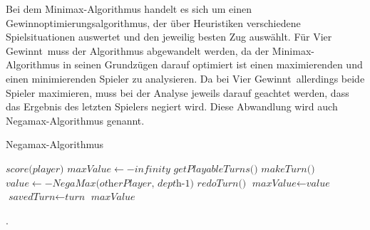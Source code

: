 Bei dem Minimax-Algorithmus handelt es sich um einen Gewinnoptimierungsalgorithmus, der über Heuristiken verschiedene Spielsituationen auswertet und den jeweilig besten Zug auswählt.
Für \glqq Vier Gewinnt\grqq ~muss der Algorithmus abgewandelt werden, da der Minimax-Algorithmus in seinen Grundzügen darauf optimiert ist einen maximierenden und einen minimierenden Spieler zu analysieren. Da bei \glqq Vier Gewinnt\grqq ~allerdings beide Spieler maximieren, muss bei der Analyse jeweils darauf geachtet werden, dass das Ergebnis des letzten Spielers negiert wird. Diese Abwandlung wird auch Negamax-Algorithmus genannt.

\begin{algorithm}
\caption{Negamax-Algorithmus}
\begin{algorithmic}[1]
\State \Return $\textit{score(player)}$
\EndIf
\State $\textit{maxValue} \gets -\textit{infinity}$
\State $\textit{getPlayableTurns()}$
\State $\textit{makeTurn()}$
\State $\textit{value} \gets -\textit{NegaMax(otherPlayer, depth-1)}$
\State $\textit{redoTurn()}$
\State $\textit{maxValue} \gets \textit{value}$
\State $\textit{savedTurn} \gets \textit{turn}$
\EndIf
\EndIf
\EndWhile
\State \Return $\textit{maxValue}$
\EndProcedure
\end{algorithmic}
\end{algorithm}.
